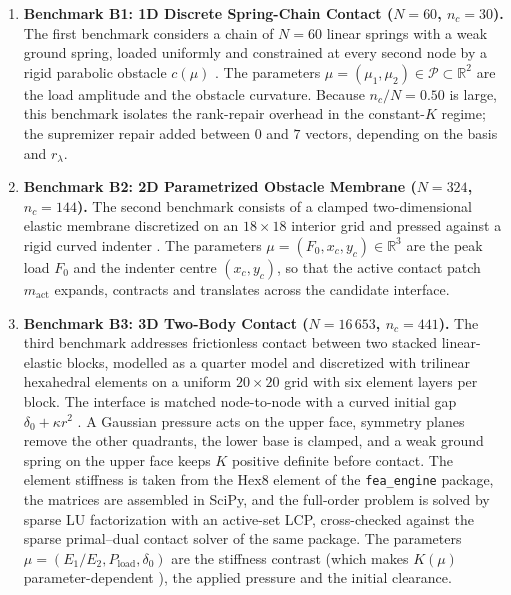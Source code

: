 \documentclass[11pt,a4paper]{article}
\providecommand{\tightlist}{\setlength{\itemsep}{0pt}\setlength{\parskip}{0pt}}
\begin{document}
\begin{enumerate}
\def\labelenumi{\arabic{enumi}.}
\tightlist
\item
  \textbf{Benchmark B1: 1D Discrete Spring-Chain Contact (\(N = 60\), \(n_c = 30\)).}
  The first benchmark considers a chain of \(N = 60\) linear springs with a weak ground spring, loaded uniformly and constrained at every second node by a rigid parabolic obstacle \(c(\mu)\) \cite{pawar2025efficient, balajewicz2016projection}. The parameters \(\mu = (\mu_1, \mu_2) \in \mathcal{P} \subset \mathbb{R}^2\) are the load amplitude and the obstacle curvature. Because \(n_c / N = 0.50\) is large, this benchmark isolates the rank-repair overhead \cite{leberre2022condition} in the constant-\(K\) regime; the supremizer repair added between \(0\) and \(7\) vectors, depending on the basis and \(r_\lambda\).
\item
  \textbf{Benchmark B2: 2D Parametrized Obstacle Membrane (\(N = 324\), \(n_c = 144\)).}
  The second benchmark consists of a clamped two-dimensional elastic membrane discretized on an \(18 \times 18\) interior grid and pressed against a rigid curved indenter \cite{benaceur2020reduced, hild2007residual, coorevits2000posteriori}. The parameters \(\mu = (F_0, x_c, y_c) \in \mathbb{R}^3\) are the peak load \(F_0\) and the indenter centre \((x_c, y_c)\), so that the active contact patch \(m_{\text{act}}\) expands, contracts and translates across the candidate interface.
\item
  \textbf{Benchmark B3: 3D Two-Body Contact (\(N = 16\,653\), \(n_c = 441\)).}
  The third benchmark addresses frictionless contact between two stacked linear-elastic blocks, modelled as a quarter model and discretized with trilinear hexahedral elements on a uniform \(20 \times 20\) grid with six element layers per block. The interface is matched node-to-node with a curved initial gap \(\delta_0 + \kappa r^2\) \cite{franceschini2022block, koller2021hyper, fauque2018hybrid}. A Gaussian pressure acts on the upper face, symmetry planes remove the other quadrants, the lower base is clamped, and a weak ground spring on the upper face keeps \(K\) positive definite before contact. The element stiffness is taken from the Hex8 element of the \texttt{fea\_engine} package, the matrices are assembled in SciPy, and the full-order problem is solved by sparse LU factorization with an active-set LCP, cross-checked against the sparse primal--dual contact solver of the same package. The parameters \(\mu = (E_1/E_2, P_{\text{load}}, \delta_0)\) are the stiffness contrast (which makes \(K(\mu)\) parameter-dependent \cite{koller2021hyper}), the applied pressure and the initial clearance.
\end{enumerate}
\end{document}
